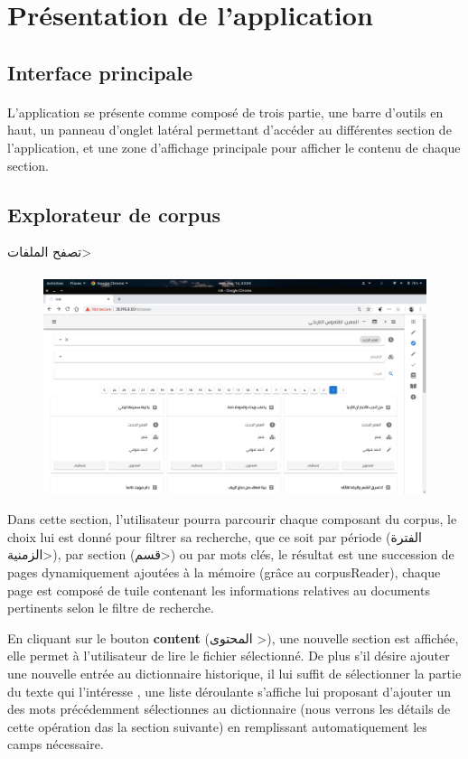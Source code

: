 \documentclass[]{report}
\begin{document}
	\section{Présentation de l'application}
		\subsection{Interface principale}
			\paragraph{}
			L'application se présente comme composé de trois partie, une barre d'outils en haut, un panneau d'onglet latéral permettant d'accéder au différentes section de l'application, et une zone d'affichage principale pour afficher le contenu de chaque section. 
			
		\subsection{Explorateur de corpus }
		\Large{\<تصفح الملفات> }
			\paragraph{}
			\begin{figure}[H]
				\centering
				\includegraphics[width=0.8\linewidth]{images/app/corpusbrowser.png}
			\end{figure}
			Dans cette section, l'utilisateur pourra parcourir chaque composant du corpus, le choix lui est donné pour filtrer 
			sa recherche, que ce soit par période (\<الفترة الزمنية>), par section (\<قسم>) ou par mots clés, le résultat est une succession de pages dynamiquement ajoutées à la mémoire (grâce au corpusReader), chaque page est composé de tuile contenant les informations relatives au documents pertinents selon le filtre de recherche.
			\par
			En cliquant sur le bouton \textbf{content} (\<المحتوى >), une nouvelle section est affichée, elle permet à l'utilisateur 
			de lire le fichier sélectionné. De plus s'il désire ajouter une nouvelle entrée au dictionnaire historique, il lui suffit de sélectionner la partie du texte qui l'intéresse , une liste déroulante s'affiche lui proposant d'ajouter un des mots précédemment sélectionnes au dictionnaire (nous verrons les détails de cette opération das la section suivante) en remplissant automatiquement les camps nécessaire.
\end{document}
